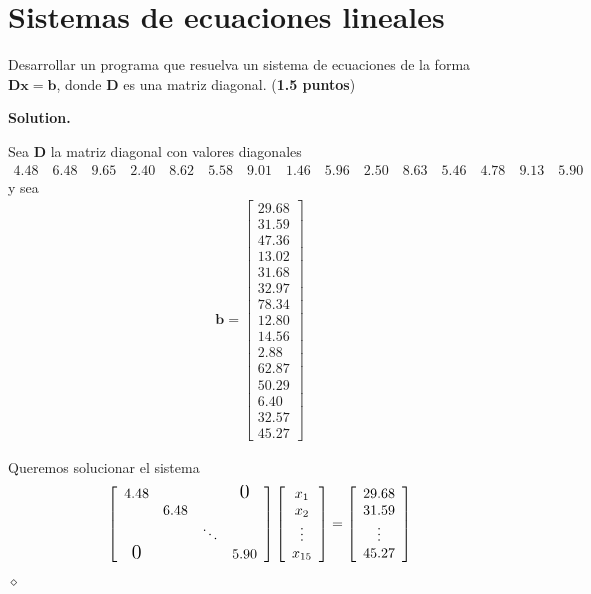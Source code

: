 \documentclass{article}
\theoremstyle{problemstyle}
\newenvironment{solution}{%
  \begin{mdframed}[linewidth=0.8pt,linecolor=Gray,backgroundcolor=Gray!5,roundcorner=5pt]%
  \noindent\textbf{Solution.}%
}{%
\hfill $ \diamond $ 
  \end{mdframed}%
}
\begin{document}
\section{Sistemas de ecuaciones lineales}\label{sec:sistemas_de_ecuaciones_lineales} %


\begin{problem}
Desarrollar un programa que resuelva un sistema de ecuaciones de la forma $\mathbf{Dx} = \mathbf{b}$, donde $ \mathbf{D} $ es una matriz diagonal. (\textbf{1.5 puntos})
\end{problem}
\begin{solution}
	Sea $ \mathbf{D} $ la matriz diagonal con valores diagonales
	\begin{align*}
		4.48\quad 6.48\quad 9.65\quad 2.40\quad 8.62\quad 5.58\quad 9.01\quad 1.46\quad 5.96\quad 2.50\quad 8.63\quad 5.46\quad 4.78\quad 9.13\quad 5.90
	\end{align*}
	y sea
	\begin{align*}
		\mathbf{b} = \begin{bmatrix}
			             29.68 \\ 31.59 \\ 47.36 \\ 13.02 \\ 31.68 \\ 32.97 \\ 78.34 \\ 12.80 \\ 14.56 \\ 2.88 \\ 62.87 \\ 50.29 \\ 6.40 \\ 32.57 \\ 45.27
		             \end{bmatrix}
	\end{align*}

	Queremos solucionar el sistema
	$$
		\left[
			\begin{array}{cccc}
				4.48            &      &        & \mbox{\Large 0} \\
				                & 6.48 &        &                 \\
				                &      & \ddots &                 \\
				\mbox{\Large 0} &      &        & 5.90            \\
			\end{array}
			\right]
		\left[
			\begin{array}{c}
				x_1    \\
				x_2    \\
				\vdots \\
				x_{15} \\
			\end{array}
			\right]
		=
		\left[
			\begin{array}{c}
				29.68  \\
				31.59  \\
				\vdots \\
				45.27  \\
			\end{array}
			\right]
	$$


\end{solution}
\end{document}
